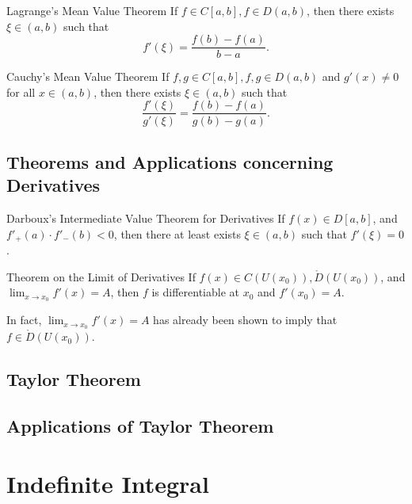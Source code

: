 \documentclass[11pt]{../../TexTemplate/elegantbook}
\begin{document}
\begin{theorem}{Lagrange's Mean Value Theorem}
    If \(f\in C[a,b], f\in D(a,b)\), then there exists \(\xi\in (a,b)\) such that
    \[
        f'(\xi) = \frac{f(b) - f(a)}{b - a}.
    \]
\end{theorem}

\begin{theorem}{Cauchy's Mean Value Theorem}
    If \(f,g\in C[a,b], f,g\in D(a,b)\) and \(g'(x) \neq 0\) for all \(x\in (a,b)\), 
    then there exists \(\xi\in (a,b)\) such that
    \[
        \frac{f'(\xi)}{g'(\xi)} = \frac{f(b) - f(a)}{g(b) - g(a)}.
    \]
\end{theorem}



\section{Theorems and Applications concerning Derivatives}

\begin{theorem}{Darboux's Intermediate Value Theorem for Derivatives}
    If \(f(x)\in D[a,b]\), and \(f'_{+}(a)\cdot f'_{-}(b)<0\),
    then there at least exists \(\xi\in (a,b)\) such that \(f'(\xi) = 0\).
\end{theorem}

\begin{theorem}{Theorem on the Limit of Derivatives}
    If \(f(x)\in C(U(x_{0})),\mathring{D}(U(x_{0}))\), and \(\lim_{x \to x_{0}} f'(x) = A\),
    then \(f\) is differentiable at \(x_{0}\) and \(f'(x_{0}) = A\).
\end{theorem}
\begin{remark}
    In fact, \(\lim_{x \to x_{0}} f'(x) = A\) has already been shown to imply that \(f\in \mathring{D}(U(x_{0}))\).
\end{remark}

\section{Taylor Theorem}

\section{Applications of Taylor Theorem}

\chapter{Indefinite Integral}
\end{document}
